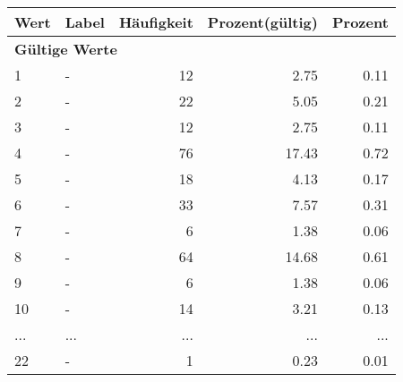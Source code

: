      \begin{longtable}{lXrrr}
     \toprule
     \textbf{Wert} & \textbf{Label} & \textbf{Häufigkeit} & \textbf{Prozent(gültig)} & \textbf{Prozent} \\
     \endhead
     \midrule
     \multicolumn{5}{l}{\textbf{Gültige Werte}}\\
        1 & \multicolumn{1}{X}{-} & %
          \num{12} &
          \num[round-mode=places,round-precision=2]{2,75} &
          \num[round-mode=places,round-precision=2]{0,11} \\
        2 & \multicolumn{1}{X}{-} & %
          \num{22} &
          \num[round-mode=places,round-precision=2]{5,05} &
          \num[round-mode=places,round-precision=2]{0,21} \\
        3 & \multicolumn{1}{X}{-} & %
          \num{12} &
          \num[round-mode=places,round-precision=2]{2,75} &
          \num[round-mode=places,round-precision=2]{0,11} \\
        4 & \multicolumn{1}{X}{-} & %
          \num{76} &
          \num[round-mode=places,round-precision=2]{17,43} &
          \num[round-mode=places,round-precision=2]{0,72} \\
        5 & \multicolumn{1}{X}{-} & %
          \num{18} &
          \num[round-mode=places,round-precision=2]{4,13} &
          \num[round-mode=places,round-precision=2]{0,17} \\
        6 & \multicolumn{1}{X}{-} & %
          \num{33} &
          \num[round-mode=places,round-precision=2]{7,57} &
          \num[round-mode=places,round-precision=2]{0,31} \\
        7 & \multicolumn{1}{X}{-} & %
          \num{6} &
          \num[round-mode=places,round-precision=2]{1,38} &
          \num[round-mode=places,round-precision=2]{0,06} \\
        8 & \multicolumn{1}{X}{-} & %
          \num{64} &
          \num[round-mode=places,round-precision=2]{14,68} &
          \num[round-mode=places,round-precision=2]{0,61} \\
        9 & \multicolumn{1}{X}{-} & %
          \num{6} &
          \num[round-mode=places,round-precision=2]{1,38} &
          \num[round-mode=places,round-precision=2]{0,06} \\
        10 & \multicolumn{1}{X}{-} & %
          \num{14} &
          \num[round-mode=places,round-precision=2]{3,21} &
          \num[round-mode=places,round-precision=2]{0,13} \\
       ... & ... & ... & ... & ... \\
        22 & \multicolumn{1}{X}{-} & %
          \num{1} &
          \num[round-mode=places,round-precision=2]{0,23} &
          \num[round-mode=places,round-precision=2]{0,01} \\


\end{longtable}
